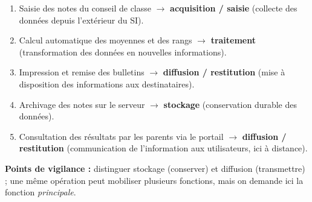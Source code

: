\documentclass[11pt]{article}
\begin{document}
\begin{corrige}
\begin{enumerate}
  \item Saisie des notes du conseil de classe $\to$ \textbf{acquisition / saisie} (collecte des données depuis l'extérieur du SI).
  \item Calcul automatique des moyennes et des rangs $\to$ \textbf{traitement} (transformation des données en nouvelles informations).
  \item Impression et remise des bulletins $\to$ \textbf{diffusion / restitution} (mise à disposition des informations aux destinataires).
  \item Archivage des notes sur le serveur $\to$ \textbf{stockage} (conservation durable des données).
  \item Consultation des résultats par les parents via le portail $\to$ \textbf{diffusion / restitution} (communication de l'information aux utilisateurs, ici à distance).
\end{enumerate}
\textbf{Points de vigilance :} distinguer stockage (conserver) et diffusion (transmettre) ; une même opération peut mobiliser plusieurs fonctions, mais on demande ici la fonction \emph{principale}.
\end{corrige}
\end{document}

